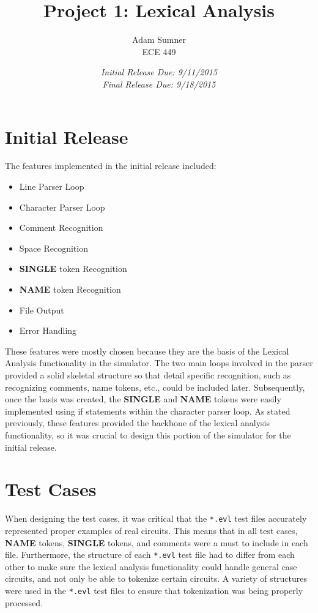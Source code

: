 \documentclass[]{article}
\title{\textbf{Project 1: Lexical Analysis}}
\author{Adam Sumner\\ECE 449}
\date{\textit{Initial Release Due: 9/11/2015}\\ \textit{Final Release Due: 9/18/2015}}
\begin{document}
\maketitle

\section{Initial Release}
The features implemented in the initial release included:
\begin{itemize}
	\item Line Parser Loop
	\item Character Parser Loop
	\item Comment Recognition
	\item Space Recognition
	\item \textbf{SINGLE} token Recognition
	\item \textbf{NAME} token Recognition
	\item File Output
	\item Error Handling
\end{itemize}
These features were mostly chosen because they are the basis of the Lexical Analysis functionality in the simulator. The two main loops involved in the parser provided a solid skeletal structure so that detail specific recognition, such as recognizing comments, name tokens, etc., could be included later. Subsequently, once the basis was created, the \textbf{SINGLE} and \textbf{NAME} tokens were easily implemented using if statements within the character parser loop. As stated previously, these features provided the backbone of the lexical analysis functionality, so it was crucial to design this portion of the simulator for the initial release.

\section{Test Cases}
When designing the test cases, it was critical that the \texttt{*.evl} test files accurately represented proper examples of real circuits. This means that in all test cases, \textbf{NAME} tokens, \textbf{SINGLE} tokens, and comments were a must to include in each file. Furthermore, the structure of each \texttt{*.evl} test file had to differ from each other to make sure the lexical analysis functionality could handle general case circuits, and not only be able to tokenize certain circuits. A variety of structures were used in the \texttt{*.evl} test files to ensure that tokenization was being properly processed. 
\end{document}
